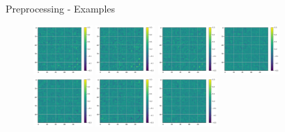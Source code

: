 \documentclass{beamer}
\begin{document}
\begin{frame}{Preprocessing - Examples}

    \begin{figure}[H]
        \centering
        \includegraphics[width=0.2\textwidth]{../Analysis/DFC/size=480_step=180_rho=0.1/node=50_id=100206/c_0.jpg}
        \includegraphics[width=0.2\textwidth]{../Analysis/DFC/size=480_step=180_rho=0.1/node=50_id=100206/c_2.jpg}
        \includegraphics[width=0.2\textwidth]{../Analysis/DFC/size=480_step=180_rho=0.1/node=50_id=100206/c_4.jpg}
        \includegraphics[width=0.2\textwidth]{../Analysis/DFC/size=480_step=180_rho=0.1/node=50_id=100206/c_6.jpg} \\
        \includegraphics[width=0.2\textwidth]{../Analysis/DFC/size=480_step=180_rho=0.1/node=50_id=100206/c_8.jpg}
        \includegraphics[width=0.2\textwidth]{../Analysis/DFC/size=480_step=180_rho=0.1/node=50_id=100206/c_10.jpg}
        \includegraphics[width=0.2\textwidth]{../Analysis/DFC/size=480_step=180_rho=0.1/node=50_id=100206/c_12.jpg}

\end{figure}
\end{frame}
\end{document}

